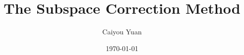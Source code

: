\documentclass{beamer}
\title{The Subspace Correction Method}
\author{Caiyou Yuan}
\date{\today}
\begin{document}
\begin{frame}
\titlepage
\end{frame}


% 


% 
\end{document}
